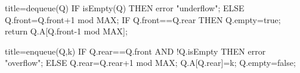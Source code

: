 \documentclass[
    ngerman,
    color=3b,
    dark_mode,
    summary,
    boxarc,
]{rubos-tuda-template}
\begin{document}
\begin{minipage}[t]{.49\textwidth}\mbox{}
    \begin{codeBlock}[autogobble]{title={dequeue(Q)}}
        IF isEmpty(Q) THEN
            error "underflow";
        ELSE
            Q.front=Q.front+1 mod MAX;
            IF Q.front==Q.rear THEN
                Q.empty=true;
            return Q.A[Q.front-1 mod MAX];
    \end{codeBlock}
\end{minipage}
\begin{minipage}[t]{.5\textwidth}\mbox{}
    \begin{codeBlock}[autogobble]{title={enqueue(Q,k)}}
        IF Q.rear==Q.front AND !Q.isEmpty
        THEN error "overflow";
        ELSE
            Q.rear=Q.rear+1 mod MAX;
            Q.A[Q.rear]=k;
            Q.empty=false;
    \end{codeBlock}
\end{minipage}

\clearpage
\end{document}
